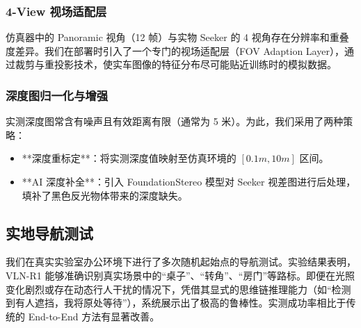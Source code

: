 \subsubsection{4-View 视场适配层}
仿真器中的 Panoramic 视角（12 帧）与实物 Seeker 的 4 视角存在分辨率和重叠度差异。我们在部署时引入了一个专门的视场适配层（FOV Adaption Layer），通过裁剪与重投影技术，使实车图像的特征分布尽可能贴近训练时的模拟数据。

\subsubsection{深度图归一化与增强}
实测深度图常含有噪声且有效距离有限（通常为 5 米）。为此，我们采用了两种策略：
\begin{itemize}
    \item **深度重标定**：将实测深度值映射至仿真环境的 $[0.1m, 10m]$ 区间。
    \item **AI 深度补全**：引入 FoundationStereo 模型对 Seeker 视差图进行后处理，填补了黑色反光物体带来的深度缺失。
\end{itemize}

\subsection{实地导航测试}
我们在真实实验室办公环境下进行了多次随机起始点的导航测试。实验结果表明，VLN-R1 能够准确识别真实场景中的“桌子”、“转角”、“房门”等路标。即便在光照变化剧烈或存在动态行人干扰的情况下，凭借其显式的思维链推理能力（如“检测到有人遮挡，我将原处等待”），系统展示出了极高的鲁棒性。实测成功率相比于传统的 End-to-End 方法有显著改善。
